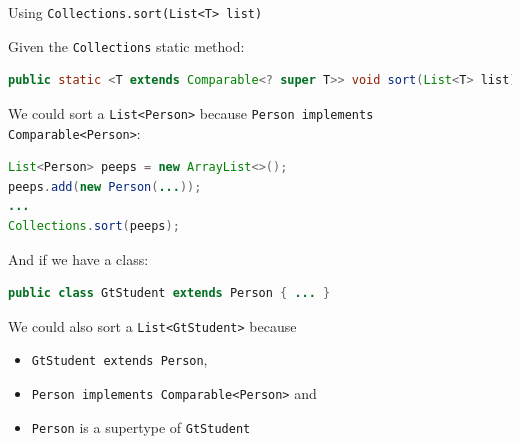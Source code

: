 \documentclass{beamer}
\begin{document}
\begin{frame}[fragile]{Using {\tt Collections.sort(List<T> list)}}


Given the {\tt Collections} static method:
\begin{lstlisting}[language=Java]
public static <T extends Comparable<? super T>> void sort(List<T> list)
\end{lstlisting}

We could sort a {\tt List<Person>} because {\tt Person implements Comparable<Person>}:
\begin{lstlisting}[language=Java]
List<Person> peeps = new ArrayList<>();
peeps.add(new Person(...));
...
Collections.sort(peeps);
\end{lstlisting}
And if we have a class:
\begin{lstlisting}[language=Java]
public class GtStudent extends Person { ... }
\end{lstlisting}

We could also sort a {\tt List<GtStudent>} because
\begin{itemize}
\item {\tt GtStudent extends Person},
\item {\tt Person implements Comparable<Person>} and
\item {\tt Person} is a supertype of {\tt GtStudent}
\end{itemize}

\end{frame}
\end{document}
